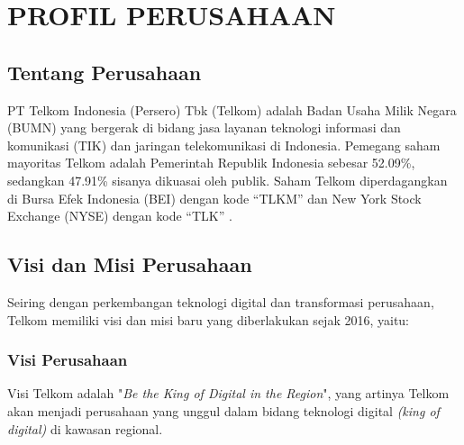\chapter{PROFIL PERUSAHAAN}
\section{Tentang Perusahaan}
\tab PT Telkom Indonesia (Persero) Tbk (Telkom) adalah Badan Usaha Milik Negara (BUMN) yang bergerak di bidang jasa layanan teknologi informasi dan komunikasi (TIK) dan jaringan telekomunikasi di Indonesia. Pemegang saham mayoritas Telkom adalah Pemerintah Republik Indonesia sebesar 52.09\%, sedangkan 47.91\% sisanya dikuasai oleh publik. Saham Telkom diperdagangkan di Bursa Efek Indonesia (BEI) dengan kode “TLKM” dan New York Stock Exchange (NYSE) dengan kode “TLK” \cite{profil-telkom}.

\section{Visi dan Misi Perusahaan}
\tab Seiring dengan perkembangan teknologi digital dan transformasi perusahaan, Telkom memiliki visi dan misi baru yang diberlakukan sejak 2016, yaitu:
\subsection{Visi Perusahaan}
\tab Visi Telkom adalah "\textit{Be the King of Digital in the Region}", yang artinya Telkom akan menjadi perusahaan yang unggul dalam bidang teknologi digital \textit{(king of digital)} di kawasan regional.
